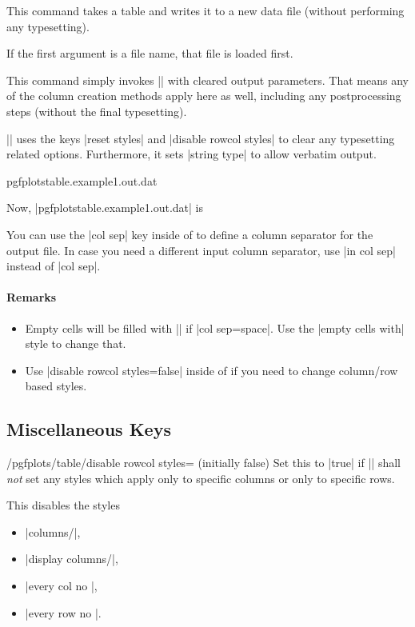\begin{command}{\pgfplotstablesave{}}
	This command takes a table and writes it to a new data file (without performing any typesetting).

	If the first argument is a file name, that file is loaded first.

	This command simply invokes |\pgfplotstabletypeset| with cleared output parameters. That means any of the column creation methods apply here as well, including any postprocessing steps (without the final typesetting).

	|\pgfplotstablesave| uses the keys |reset styles| and |disable rowcol styles| to clear any typesetting related options. Furthermore, it sets |string type| to allow verbatim output.
\begin{codeexample}[]
	{pgfplotstable.example1.out.dat}
\end{codeexample}
Now, |pgfplotstable.example1.out.dat| is


You can use the |col sep| key inside of  to define a column separator for the output file. In case you need a different input column separator, use |in col sep| instead of |col sep|.

\paragraph{Remarks}
\begin{itemize}
	\item 
Empty cells will be filled with |{}| if |col sep=space|. Use the |empty cells with| style to change that.
	\item  Use |disable rowcol styles=false| inside of  if you need to change column/row based styles.
\end{itemize}
\end{command}

\subsection{Miscellaneous Keys}
\begin{key}{/pgfplots/table/disable rowcol styles= (initially false)}
	Set this to |true| if |\pgfplotstabletypeset| shall \emph{not} set any styles which apply only to specific columns or only to specific rows.

	This disables the styles
	\begin{itemize}
		\item |columns/|,
		\item |display columns/|,
		\item |every col no |,
		\item |every row no |.
	\end{itemize}
\end{key}

